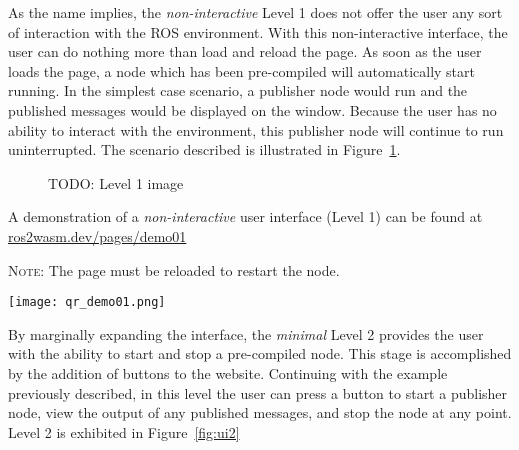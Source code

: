         As the name implies, the \textit{non-interactive} Level 1 does not offer the user
        any sort of interaction with the \ac{ROS} environment. With this non-interactive
        interface, the user can do nothing more than load and reload the page. 
        As soon as the user loads the page, a node which has been pre-compiled 
        will automatically start running. In the simplest case scenario, a publisher
        node would run and the published messages would be displayed on the window.
        Because the user has no ability to interact with the environment, this
        publisher node will continue to run uninterrupted. The scenario described
        is illustrated in Figure~\ref{fig:ui1}.

        \begin{figure}[htbp]
            \centering
            \caption{TODO: Level 1 image}\label{fig:ui1}
        \end{figure}

        \begin{tcolorbox}[title=Example 1]
            \begin{minipage}[t]{0.87\linewidth}
                \vspace*{0pt}
                A demonstration of a \textit{non-interactive} user interface (Level 1) can
                be found at \href{https://ros2wasm.dev/pages/demo01/index.html}{\textsf{ros2wasm.dev/pages/demo01}}

                \textsc{Note:} The page must be reloaded to restart the node.
            \end{minipage}\hfill%
            \begin{minipage}[t]{0.1\linewidth}
                \vspace*{0pt}
                \texttt{[image: qr\_demo01.png]}
            \end{minipage}
        \end{tcolorbox}



        By marginally expanding the interface, the \textit{minimal} Level 2 provides
        the user with the ability to start and stop a pre-compiled node. This 
        stage is accomplished by the addition of buttons to the website. Continuing
        with the example previously described, in this level the user can press
        a button to start a publisher node, view the output of any published 
        messages, and stop the node at any point. Level 2 is exhibited in Figure~\ref{fig:ui2}

